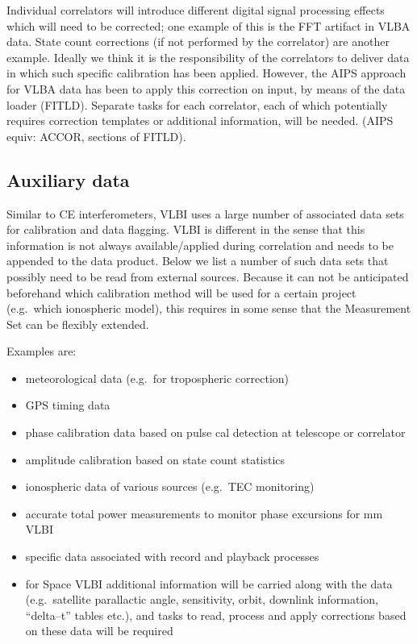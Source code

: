 Individual correlators will introduce different digital signal
processing effects which will need to be corrected; one example of
this is the FFT artifact in VLBA data. State count corrections (if not
performed by the correlator) are another example.  Ideally we think it
is the responsibility of the correlators to deliver data in which such
specific calibration has been applied.  However, the AIPS approach for
VLBA data has been to apply this correction on input, by means of the
data loader (FITLD). Separate tasks for each correlator, each of which
potentially requires correction templates or additional information,
will be needed. (AIPS equiv: ACCOR, sections of FITLD).

\subsection{Auxiliary data}
\label{auxin}

Similar to CE interferometers, VLBI uses a large number of associated
data sets for calibration and data flagging. VLBI is different in the
sense that this information is not always available\slash applied during
correlation and needs to be appended to the data product. Below we
list a number of such data sets that possibly need to be read from
external sources. Because it can not be anticipated beforehand which
calibration method will be used for a certain project (e.g.\ which 
ionospheric model), this requires in some sense that the Measurement
Set can be flexibly extended.

\noindent Examples are:
\begin{itemize}
  
\item meteorological data (e.g.\ for tropospheric correction)

\item GPS timing data

\item phase calibration data based on pulse cal detection at telescope
  or correlator

\item amplitude calibration based on state count statistics

\item ionospheric data of various sources (e.g.\ TEC monitoring)
  
\item accurate total power measurements to monitor phase excursions
  for mm VLBI
  
\item specific data associated with record and playback processes
   
\item for Space VLBI additional information will be carried along with
  the data (e.g.\ satellite parallactic angle, sensitivity, orbit,
  downlink information, ``delta--t'' tables etc.), and tasks to read,
  process and apply corrections based on these data will be required

\end{itemize}

